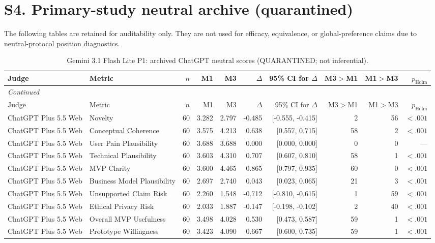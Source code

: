 \documentclass[10pt]{article}
\begin{document}
\section*{S4. Primary-study neutral archive (quarantined)}
The following tables are retained for auditability only. They are not used for
efficacy, equivalence, or global-preference claims due to neutral-protocol position
diagnostics. 
\begin{landscape}
\small
\setlength{\LTcapwidth}{\textwidth}
\begin{longtable}{llrrrrrrrr}
\caption{Gemini 3.1 Flash Lite P1: archived ChatGPT neutral scores (QUARANTINED; not inferential).}\label{tab:s4-neu31}\\
\toprule
Judge & Metric & $n$ & M1 & M3 & $\Delta$ & 95\% CI for $\Delta$ & M3$>$M1 & M1$>$M3 & $p_{\mathrm{Holm}}$ \\
\midrule\endfirsthead
\multicolumn{10}{l}{\small\itshape Continued}\\
\toprule Judge & Metric & $n$ & M1 & M3 & $\Delta$ & 95\% CI for $\Delta$ & M3$>$M1 & M1$>$M3 & $p_{\mathrm{Holm}}$ \\ \midrule\endhead
\bottomrule\endfoot
ChatGPT Plus 5.5 Web & Novelty & 60 & 3.282 & 2.797 & -0.485 & [-0.555, -0.415] & 2 & 56 & $<.001$ \\
ChatGPT Plus 5.5 Web & Conceptual Coherence & 60 & 3.575 & 4.213 & 0.638 & [0.557, 0.715] & 58 & 2 & $<.001$ \\
ChatGPT Plus 5.5 Web & User Pain Plausibility & 60 & 3.688 & 3.688 & 0.000 & [0.000, 0.000] & 0 & 0 & — \\
ChatGPT Plus 5.5 Web & Technical Plausibility & 60 & 3.603 & 4.310 & 0.707 & [0.607, 0.810] & 58 & 1 & $<.001$ \\
ChatGPT Plus 5.5 Web & MVP Clarity & 60 & 3.600 & 4.465 & 0.865 & [0.797, 0.935] & 60 & 0 & $<.001$ \\
ChatGPT Plus 5.5 Web & Business Model Plausibility & 60 & 2.697 & 2.740 & 0.043 & [0.023, 0.065] & 21 & 3 & $<.001$ \\
ChatGPT Plus 5.5 Web & Unsupported Claim Risk & 60 & 2.260 & 1.548 & -0.712 & [-0.810, -0.615] & 1 & 59 & $<.001$ \\
ChatGPT Plus 5.5 Web & Ethical Privacy Risk & 60 & 2.033 & 1.887 & -0.147 & [-0.198, -0.102] & 2 & 40 & $<.001$ \\
ChatGPT Plus 5.5 Web & Overall MVP Usefulness & 60 & 3.498 & 4.028 & 0.530 & [0.473, 0.587] & 59 & 1 & $<.001$ \\
ChatGPT Plus 5.5 Web & Prototype Willingness & 60 & 3.423 & 4.090 & 0.667 & [0.600, 0.735] & 59 & 1 & $<.001$ \\
\end{longtable}
\end{landscape}
\end{document}
